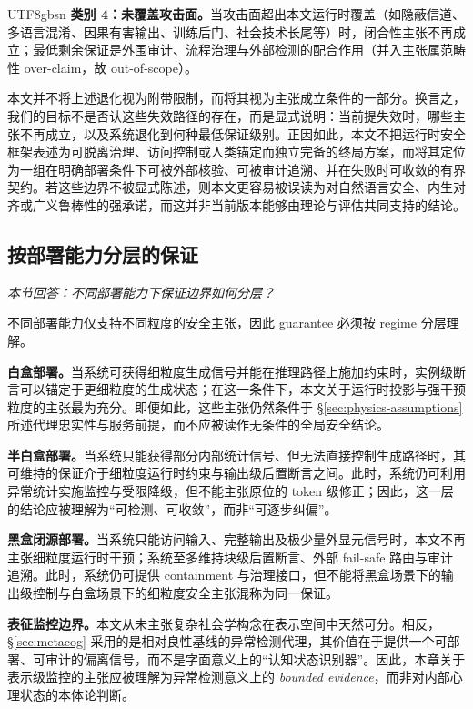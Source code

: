 \documentclass[letterpaper,twocolumn,10pt]{article}
\begin{document}
\begin{CJK}{UTF8}{gbsn}
\textbf{类别 4：未覆盖攻击面。}当攻击面超出本文运行时覆盖（如隐蔽信道、多语言混淆、因果有害输出、训练后门、社会技术长尾等）时，闭合性主张不再成立；最低剩余保证是外围审计、流程治理与外部检测的配合作用（并入主张属范畴性 over-claim，故 out-of-scope）。

\smallskip
\noindent 本文并不将上述退化视为附带限制，而将其视为主张成立条件的一部分。换言之，我们的目标不是否认这些失效路径的存在，而是显式说明：当前提失效时，哪些主张不再成立，以及系统退化到何种最低保证级别。正因如此，本文不把运行时安全框架表述为可脱离治理、访问控制或人类锚定而独立完备的终局方案，而将其定位为一组在明确部署条件下可被外部核验、可被审计追溯、并在失败时可收敛的有界契约。若这些边界不被显式陈述，则本文更容易被误读为对自然语言安全、内生对齐或广义鲁棒性的强承诺，而这并非当前版本能够由理论与评估共同支持的结论。

\subsection{按部署能力分层的保证}
\label{sec:physics-regimes}

\noindent\textit{本节回答：不同部署能力下保证边界如何分层？}

\noindent 不同部署能力仅支持不同粒度的安全主张，因此 guarantee 必须按 regime 分层理解。

\textbf{白盒部署。}当系统可获得细粒度生成信号并能在推理路径上施加约束时，实例级断言可以锚定于更细粒度的生成状态；在这一条件下，本文关于运行时投影与强干预粒度的主张最为充分。即便如此，这些主张仍然条件于 \S\ref{sec:physics-assumptions} 所述代理忠实性与服务前提，而不应被读作无条件的全局安全结论。

\textbf{半白盒部署。}当系统只能获得部分内部统计信号、但无法直接控制生成路径时，其可维持的保证介于细粒度运行时约束与输出级后置断言之间。此时，系统仍可利用异常统计实施监控与受限降级，但不能主张原位的 token 级修正；因此，这一层的结论应被理解为``可检测、可收敛''，而非``可逐步纠偏''。

\textbf{黑盒闭源部署。}当系统只能访问输入、完整输出及极少量外显元信号时，本文不再主张细粒度运行时干预；系统至多维持块级后置断言、外部 fail-safe 路由与审计追溯。此时，系统仍可提供 containment 与治理接口，但不能将黑盒场景下的输出级控制与白盒场景下的细粒度安全主张混称为同一保证。

\textbf{表征监控边界。}本文从未主张复杂社会学构念在表示空间中天然可分。相反，\S\ref{sec:metacog} 采用的是相对良性基线的异常检测代理，其价值在于提供一个可部署、可审计的偏离信号，而不是字面意义上的``认知状态识别器''。因此，本章关于表示级监控的主张应被理解为异常检测意义上的 \emph{bounded evidence}，而非对内部心理状态的本体论判断。


\end{CJK}
\end{document}
